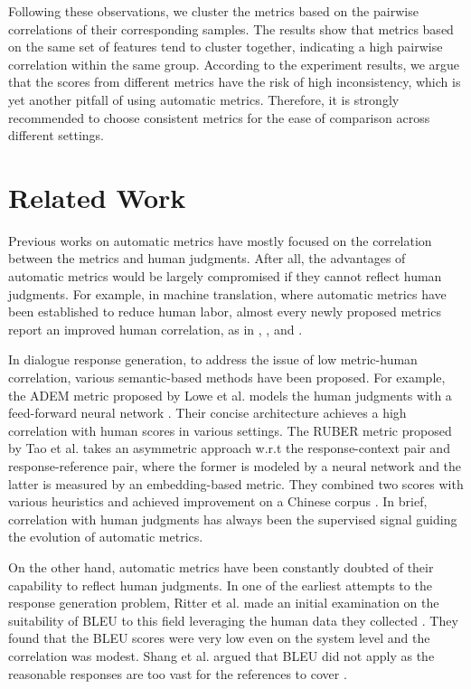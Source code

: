 \documentclass[runningheads]{llncs}
\begin{document}
    Following these observations, we cluster the metrics based on the pairwise correlations of their corresponding samples. The results show that metrics based on the same set of features tend to cluster together, indicating a high pairwise correlation within the same group. According to the experiment results, we argue that the scores from different metrics have the risk of high inconsistency, which is yet another pitfall of using automatic metrics. Therefore, it is strongly recommended to choose consistent metrics for the ease of comparison across different settings.

    \section{Related Work}
    Previous works on automatic metrics have mostly focused on the correlation between the metrics and human judgments. After all, the advantages of automatic metrics would be largely compromised if they cannot reflect human judgments. For example, in machine translation, where automatic metrics have been established to reduce human labor, almost every newly proposed metrics report an improved human correlation, as in \cite{NIST}, \cite{METEOR}, and \cite{chrf}.

    In dialogue response generation, to address the issue of low metric-human correlation, various semantic-based methods have been proposed. For example, the ADEM metric proposed by Lowe et al. models the human judgments with a feed-forward neural network \cite{ADEM}. Their concise architecture achieves a high correlation with human scores in various settings. The RUBER metric proposed by Tao et al. takes an asymmetric approach w.r.t the response-context pair and response-reference pair, where the former is modeled by a neural network and the latter is measured by an embedding-based metric. They combined two scores with various heuristics and achieved improvement on a Chinese corpus \cite{RUBER}. In brief, correlation with human judgments has always been the supervised signal guiding the evolution of automatic metrics.

    On the other hand, automatic metrics have been constantly doubted of their capability to reflect human judgments. In one of the earliest attempts to the response generation problem, Ritter et al. made an initial examination on the suitability of BLEU to this field leveraging the human data they collected \cite{Ritter11}. They found that the BLEU scores were very low even on the system level and the correlation was modest. Shang et al. argued that BLEU did not apply as the reasonable responses are too vast for the references to cover \cite{Shang}.
\end{document}
